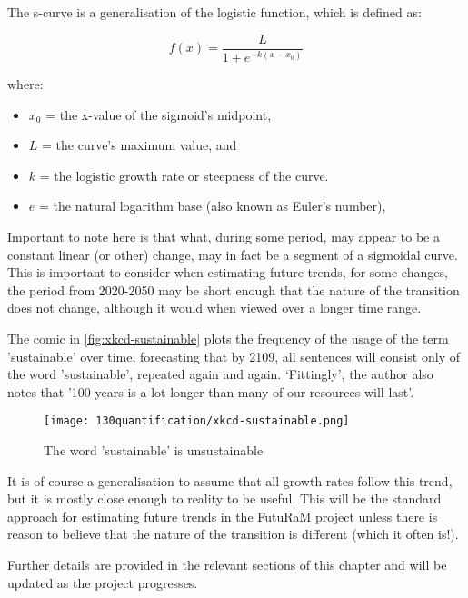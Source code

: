 The s-curve is a generalisation of the logistic function, which is defined as:

\begin{equation}
  f(x) = \frac{L}{1+e^{-k(x-x_0)}}
\end{equation}

where:

\begin{itemize}
  \item $x_0$ = the x-value of the sigmoid's midpoint,
  \item $L$ = the curve's maximum value, and
  \item $k$ = the logistic growth rate or steepness of the curve.
  \item $e$ = the natural logarithm base (also known as Euler's number),
\end{itemize}

Important to note here is that what, during some period, may appear to be a constant linear (or other) change, may in fact be a segment of a sigmoidal curve. This is important to consider when estimating future trends, for some changes, the period from 2020-2050 may be short enough that the nature of the transition does not change, although it would when viewed over a longer time range.

\begin{samepage}
The comic in \autoref{fig:xkcd-sustainable} plots the frequency of the usage of the term 'sustainable' over time, forecasting that by 2109, all sentences will consist only of the word 'sustainable', repeated again and again. `Fittingly', the author also notes that '100 years is a lot longer than many of our resources will last'. 

\begin{figure}[ht!]
  \centering
  \texttt{[image: 130quantification/xkcd-sustainable.png]}
  \caption[The word 'sustainable' is unsustainable]{The word 'sustainable' is unsustainable~\cite{xkcd-sustainable}}
  \label{fig:xkcd-sustainable}
\end{figure}
\end{samepage}

It is of course a generalisation to assume that all growth rates follow this trend, but it is mostly close enough to reality to be useful. This will be the standard approach for estimating future trends in the FutuRaM project unless there is reason to believe that the nature of the transition is different (which it often is!). 

Further details are provided in the relevant sections of this chapter and will be updated as the project progresses.

\clearpage


\clearpage

\clearpage

\clearpage

\clearpage



\chapterEndlines